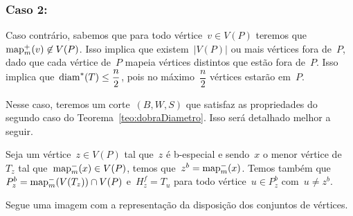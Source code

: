 	\bigskip
	\bigskip

		\subsubsection*{Caso 2:}
			Caso contrário, sabemos que para todo vértice~${v\in V(P)}$
			teremos que~${\mathrm{map}_m^+(v)\not\in V(P)}$.
			Isso implica que existem~$|V(P)|$ ou mais vértices fora de~$P$,
			dado que cada vértice de~$P$ mapeia vértices distintos que estão
			fora de~$P$.
			Isso implica que~$\mathrm{diam}^*(T)\le\dfrac{n}{2}$, pois no 
			máximo~$\dfrac{n}{2}$ vértices estarão em~$P$.

			Nesse caso, teremos um corte~$(B,W,S)$ que satisfaz as
			propriedades do segundo caso do Teorema~\ref{teo:dobraDiametro}.
			Isso será detalhado melhor a seguir.

			\bigskip
			

			Seja um vértice~${z\in V(P)}$ tal que~$z$ é b-especial e
			sendo~$x$ o menor vértice de~$T_z$ tal 
			que~${\mathrm{map}^-_m(x)\in V(P)}$, temos 
			que~${z^b = \mathrm{map}^-_m(x)}$.
			Temos também
			que~${P_z^b = \mathrm{map}^-_m(V(T_z))\cap V(P)}$
			e~${H_z^f =T_u}$ para todo 
			vértice~${u\in P_z^b}$ com~${u\ne z^b}$.

			Segue uma imagem com a representação da disposição dos 
			conjuntos de vértices.


